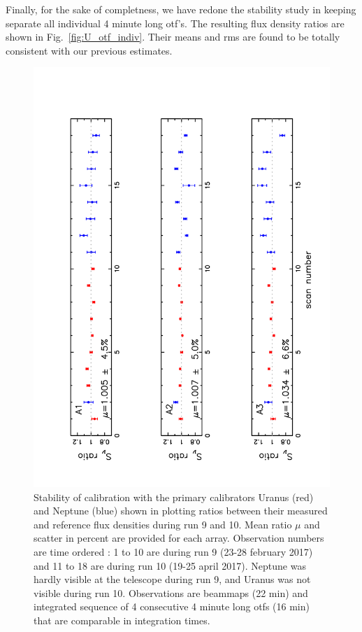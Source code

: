 Finally, for the sake of completness, we have redone the stability study
in keeping separate all individual 4 minute long otf's.
The resulting flux density ratios are shown in Fig.~\ref{fig:U_otf_indiv}.
Their means and rms are found to be totally consistent with our previous estimates.


\begin{figure}[p]
\begin{center}
  \includegraphics[clip, angle=-90, scale=0.6]{Figures/Ura_Nept_r9_10.pdf}
  \caption{Stability of calibration with the primary calibrators
    Uranus (red) and Neptune (blue)  shown in plotting
    ratios between their measured and reference flux densities during run 9 and 10.
    Mean ratio $\mu$ and scatter in percent are provided for each array.
    Observation numbers are time ordered : 1 to 10 are during run 9 (23-28 february 2017) and 11 to 18 are during run 10 (19-25 april 2017).
    Neptune was hardly visible at the telescope during run 9, and Uranus was not visible during run 10.
    Observations are beammaps (22 min) and integrated sequence of 4 consecutive 4 minute long otfs (16 min) that are
    comparable in integration times.}
\label{fig:U_N_ratio}
\end{center}
\end{figure}

